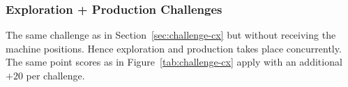 \documentclass[12pt,twoside]{article}
\newcommand{\refsec}[1]{Section~\ref{#1}}
\newcommand{\reffig}[1]{Figure~\ref{#1}}
\newcommand{\reftab}[1]{Table~\ref{#1}}
\begin{document}
\subsubsection{Exploration + Production Challenges}\label{sec:challenge-combine-exp-c0}
The same challenge as in \refsec{sec:challenge-cx} but without receiving the
machine positions. Hence exploration and production takes place concurrently.
The same point scores as in \reffig{tab:challenge-cx} apply with an additional
$+20$ per challenge.
\end{document}

